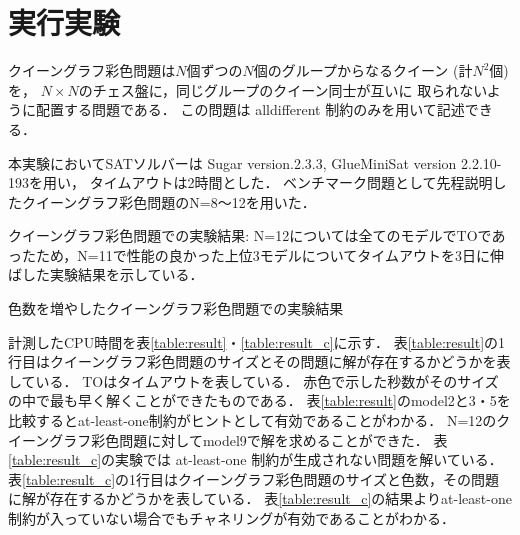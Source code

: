 \section{実行実験}
クイーングラフ彩色問題は$N$個ずつの$N$個のグループからなるクイーン (計$N^2$個) を，
$N\times N$のチェス盤に，同じグループのクイーン同士が互いに
取られないように配置する問題である．
この問題は alldifferent 制約のみを用いて記述できる．

本実験においてSATソルバーは Sugar version.2.3.3, GlueMiniSat version 2.2.10-193を用い，
タイムアウトは2時間とした．
ベンチマーク問題として先程説明したクイーングラフ彩色問題のN=8〜12を用いた．

\begin{table}[t]
    \caption{クイーングラフ彩色問題での実験結果: N=12については全てのモデルでTOであったため，N=11で性能の良かった上位3モデルについてタイムアウトを3日に伸ばした実験結果を示している．}
    \label{table:result}
    {\tiny }
\end{table}

\begin{table}[t]
    \caption{色数を増やしたクイーングラフ彩色問題での実験結果}
    \label{table:result_c}
    {\scriptsize }
\end{table}
計測したCPU時間を表\ref{table:result}・\ref{table:result_c}に示す．
表\ref{table:result}の1行目はクイーングラフ彩色問題のサイズとその問題に解が存在するかどうかを表している．
TOはタイムアウトを表している．
赤色で示した秒数がそのサイズの中で最も早く解くことができたものである．
表\ref{table:result}のmodel2と3・5を比較するとat-least-one制約がヒントとして有効であることがわかる．
N=12のクイーングラフ彩色問題に対してmodel9で解を求めることができた．
表\ref{table:result_c}の実験では at-least-one 制約が生成されない問題を解いている．
表\ref{table:result_c}の1行目はクイーングラフ彩色問題のサイズと色数，その問題に解が存在するかどうかを表している．
表\ref{table:result_c}の結果よりat-least-one制約が入っていない場合でもチャネリングが有効であることがわかる．

